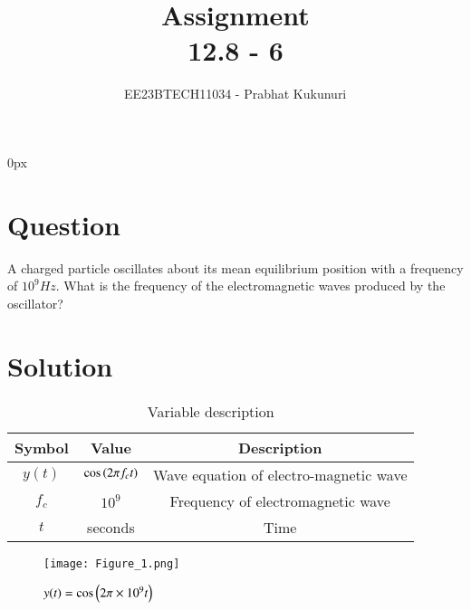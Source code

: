 \documentclass[journal,12pt,twocolumn]{IEEEtran}
\theoremstyle{remark}
\begin{document}
\parindent 0px


\title{Assignment\\[1ex]12.8 - 6}
\author{EE23BTECH11034 - Prabhat Kukunuri$^{}$%
}
\maketitle
\newpage
\bigskip

\renewcommand{\thefigure}{\theenumi}
\renewcommand{\thetable}{\theenumi}
\section*{Question}
A charged particle oscillates about its mean equilibrium position with a frequency of $10^9Hz$. What is the frequency of the electromagnetic waves produced by the oscillator?

\section*{Solution}
\fi
\begin{table}[h]
    \centering
    \begin{tabular}{|c|c|c|}
    \hline
   Symbol&Value&Description\\ \hline
   $y(t)$&$\cos\brak{2{\pi}f_ct}$&Wave equation of electro-magnetic wave\\ \hline
   $f_c$&$10^9$&Frequency of electromagnetic wave\\ \hline
   $t$&seconds&Time\\ \hline

    \end{tabular}
    \caption{Variable description}
    \label{tab:12.8.6.1}
\end{table}

\begin{figure}[h]
    \centering
    \texttt{[image: Figure\_1.png]}
    \caption{$y(t)=\cos\brak{2{\pi}\times 10^9t}$}
    \label{fig:12.8.6.2}
\end{figure}
\end{document}
